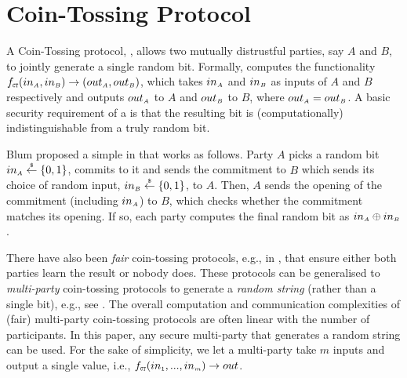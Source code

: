 




\section{Coin-Tossing Protocol}\label{sec::coin-tossing}

A Coin-Tossing protocol, \ct, allows two mutually distrustful parties, say $A$ and $B$, to jointly generate a single random bit. Formally, \ct computes the functionality $f_{\scriptscriptstyle \mathtt{CT}}(in_{\scriptscriptstyle A}, in_{\scriptscriptstyle B})\rightarrow (out_{\scriptscriptstyle A}, out_{\scriptscriptstyle B})$, which takes $in_{\scriptscriptstyle A}$ and  $in_{\scriptscriptstyle B}$ as inputs of $A$ and $B$ respectively and outputs $out_{\scriptscriptstyle A}$ to $A$ and $out_{\scriptscriptstyle B}$ to $B$, where $out_{\scriptscriptstyle A}=out_{\scriptscriptstyle B}$. A basic security requirement of a \ct is that the resulting bit is (computationally) indistinguishable from a truly random bit. 

Blum proposed a simple \ct in \cite{Blum82} that works as follows. Party $A$ picks a random bit $in_{\scriptscriptstyle A}\stackrel{\scriptscriptstyle \$}\leftarrow\{0,1\}$, commits to it and sends the commitment to $B$ which sends its choice of random input, $in_{\scriptscriptstyle B}\stackrel{\scriptscriptstyle \$}\leftarrow\{0,1\}$, to $A$. Then, $A$ sends the opening of the commitment (including $in_{\scriptscriptstyle A}$) to $B$, which checks whether the commitment matches its opening. If so, each party computes the final random bit as $in_{\scriptscriptstyle A}\oplus in_{\scriptscriptstyle B}$.  

There have also been \emph{fair} coin-tossing protocols, e.g., in \cite{MoranNS09}, that ensure either both parties learn the result or nobody does. These protocols can be generalised to \emph{multi-party} coin-tossing protocols to generate a \emph{random string} (rather than a single bit), e.g., see \cite{BeimelOO10,KiayiasRDO17}.
%
The overall computation and communication complexities of (fair) multi-party coin-tossing protocols are often linear with the number of participants. In this paper, any secure multi-party \ct that generates a random string can be used. For the sake of simplicity, we let a multi-party \fct take $m$ inputs and output a single value, i.e., $f_{\scriptscriptstyle \mathtt{CT}}(in_{\scriptscriptstyle 1}, ..., in_{\scriptscriptstyle m})\rightarrow out$. 




